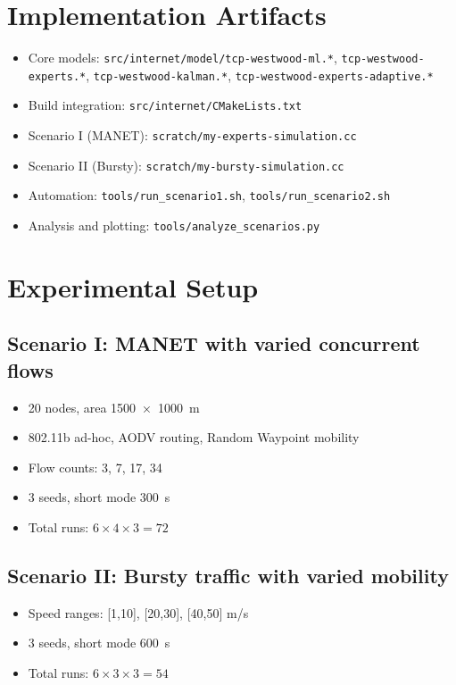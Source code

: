 \documentclass[11pt,a4paper]{article}
\begin{document}
\section{Implementation Artifacts}
\begin{itemize}
    \item Core models: \texttt{src/internet/model/tcp-westwood-ml.*}, \texttt{tcp-westwood-experts.*}, \texttt{tcp-westwood-kalman.*}, \texttt{tcp-westwood-experts-adaptive.*}
    \item Build integration: \texttt{src/internet/CMakeLists.txt}
    \item Scenario I (MANET): \texttt{scratch/my-experts-simulation.cc}
    \item Scenario II (Bursty): \texttt{scratch/my-bursty-simulation.cc}
    \item Automation: \texttt{tools/run\_scenario1.sh}, \texttt{tools/run\_scenario2.sh}
    \item Analysis and plotting: \texttt{tools/analyze\_scenarios.py}
\end{itemize}

\section{Experimental Setup}
\subsection{Scenario I: MANET with varied concurrent flows}
\begin{itemize}
    \item 20 nodes, area \SI{1500x1000}{m}
    \item 802.11b ad-hoc, AODV routing, Random Waypoint mobility
    \item Flow counts: 3, 7, 17, 34
    \item 3 seeds, short mode \SI{300}{s}
    \item Total runs: $6 \times 4 \times 3 = 72$
\end{itemize}

\subsection{Scenario II: Bursty traffic with varied mobility}
\begin{itemize}
    \item Speed ranges: [1,10], [20,30], [40,50] m/s
    \item 3 seeds, short mode \SI{600}{s}
    \item Total runs: $6 \times 3 \times 3 = 54$
\end{itemize}
\end{document}
